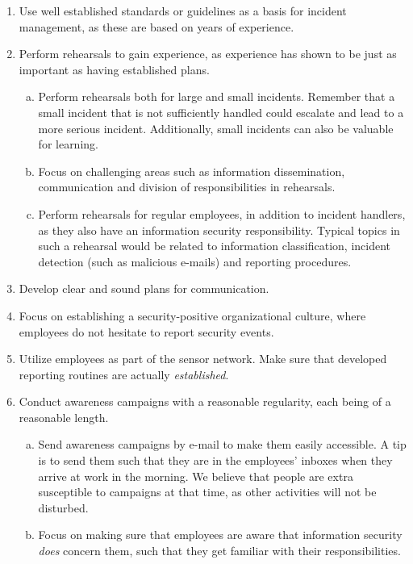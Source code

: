 \begin{enumerate}
\item Use well established standards or guidelines as a basis for incident management, as these are based on years of experience. 
\item Perform rehearsals to gain experience, as experience has shown to be just as important as having established plans.
\begin{enumerate}[a)]
\item Perform rehearsals both for large and small incidents. Remember that a small incident that is not sufficiently handled could escalate and lead to a more serious incident. Additionally, small incidents can also be valuable for learning.
\item Focus on challenging areas such as information dissemination, communication and division of responsibilities in rehearsals.
\item Perform rehearsals for regular employees, in addition to incident handlers, as they also have an information security responsibility. Typical topics in such a rehearsal would be related to information classification, incident detection (such as malicious e-mails) and reporting procedures. 
\end{enumerate}
\item Develop clear and sound plans for communication.
\item Focus on establishing a security-positive organizational culture, where employees do not hesitate to report security events.
\item Utilize employees as part of the sensor network. Make sure that developed reporting routines are actually \textit{established}.
\item Conduct awareness campaigns with a reasonable regularity, each being of a reasonable length. %
\begin{enumerate}[a)]
\item Send awareness campaigns by e-mail to make them easily accessible. A tip is to send them such that they are in the employees' inboxes when they arrive at work in the morning. We believe that people are extra susceptible to campaigns at that time, as other activities will not be disturbed.
\item Focus on making sure that employees are aware that information security \textit{does} concern them, such that they get familiar with their responsibilities.

\end{enumerate}
\end{enumerate}

